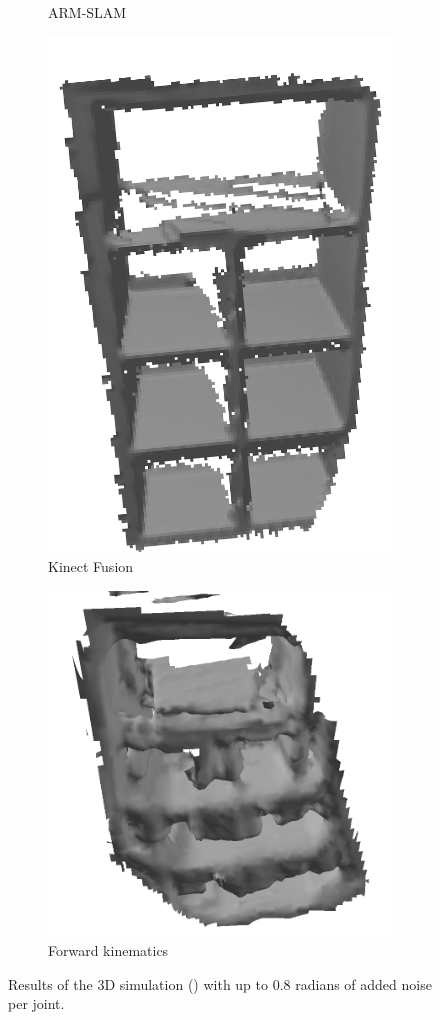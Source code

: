 \begin{figure}[ht!]
\begin{subfigure}{0.4\columnwidth}
	\caption{ARM-SLAM}
\end{subfigure}
\begin{subfigure}{0.4\columnwidth}
	\centering
	\includegraphics[height=1.0\textwidth]{img/arm_slam/kinfu_sim.png}
	\caption{Kinect Fusion}
\end{subfigure}
\begin{subfigure}{0.4\columnwidth}
	\centering
	\includegraphics[height=1.0\textwidth]{img/arm_slam/kinematics_sim.png}
	\caption{Forward kinematics}
\end{subfigure}
\caption{Results of the 3D simulation () with up to 0.8 radians of added noise per joint.}
\label{fig:3d_experiments}
\end{figure}

